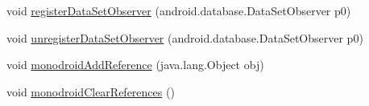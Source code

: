 \begin{DoxyCompactItemize}
void \hyperlink{classfieldservice_1_1android_1_1_labor_type_spinner_adapter_a5c86922a99b298e3d9be68bea4dfeb76}{register\+Data\+Set\+Observer} (android.\+database.\+Data\+Set\+Observer p0)
\item 
void \hyperlink{classfieldservice_1_1android_1_1_labor_type_spinner_adapter_ad639373fbdcf0d02d5c443395de12e18}{unregister\+Data\+Set\+Observer} (android.\+database.\+Data\+Set\+Observer p0)
\item 
void \hyperlink{classfieldservice_1_1android_1_1_labor_type_spinner_adapter_ade33f150210e351f0a7c63e333d37db4}{monodroid\+Add\+Reference} (java.\+lang.\+Object obj)
\item 
void \hyperlink{classfieldservice_1_1android_1_1_labor_type_spinner_adapter_a83d28dd65335b697267e9a8fccd8b71d}{monodroid\+Clear\+References} ()
\end{DoxyCompactItemize}


